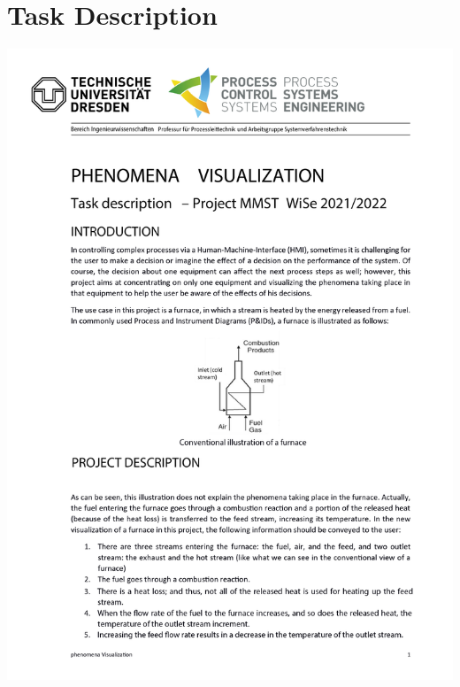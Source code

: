 \section*{Task Description}

\includegraphics[page=1,scale=0.72]{images/MMST_Aufgabenstellung_PhenomenaVisualization.png}
